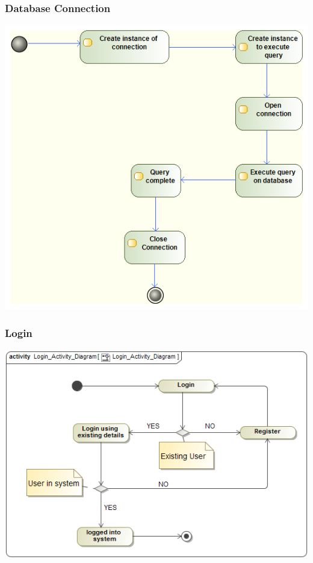 \documentclass[11pt]{article}
\begin{document}
\begin{center}
\newpage
\subsubsection{Database Connection}
\begin{center} 
	\includegraphics[width=\textwidth]{../Images/Database_Connection_Activity-Diagram.png}\\[0.5cm]
\end{center}

\newpage
\subsubsection{Login}
\begin{center} 
	\includegraphics[width=\textwidth]{../Images/Login_Activity_Diagram.png}\\[0.5cm]
\end{center}


\end{center}
\end{document}
